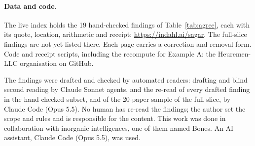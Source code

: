 \documentclass[reprint,amsmath,amssymb,aps,superscriptaddress,nofootinbib]{revtex4-2}
\begin{document}
\paragraph*{Data and code.} The live index holds the 19 hand-checked findings of Table~\ref{tab:agree}, each with its quote, location, arithmetic and receipt: \url{https://indahl.ai/sagar}. The full-slice findings are not yet listed there. Each page carries a correction and removal form. Code and receipt scripts, including the recompute for Example A: the Heuremen-LLC organisation on GitHub.

\begin{acknowledgments}
The findings were drafted and checked by automated readers: drafting and blind second reading by Claude Sonnet agents, and the re-read of every drafted finding in the hand-checked subset, and of the 20-paper sample of the full slice, by Claude Code (Opus 5.5). No human has re-read the findings; the author set the scope and rules and is responsible for the content. This work was done in collaboration with inorganic intelligences, one of them named Bones. An AI assistant, Claude Code (Opus 5.5), was used.
\end{acknowledgments}


\end{document}
